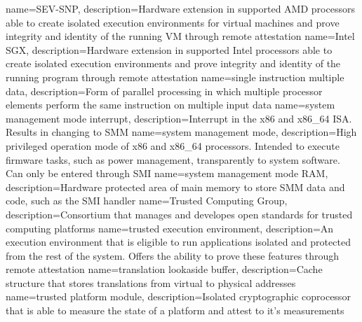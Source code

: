 %
{
    name=SEV-SNP,
    description={Hardware extension in supported AMD processors able to create isolated execution environments for
            virtual machines and prove integrity and identity of the running VM through remote attestation}
}
{
    name=Intel SGX,
    description={Hardware extension in supported Intel processors able to create isolated execution environments and
            prove integrity and identity of the running program through remote attestation}
}
{
    name={single instruction multiple data},
    description={Form of parallel processing in which multiple processor elements perform the same instruction on
            multiple input data}
}
{
    name=system management mode interrupt,
    description={Interrupt in the x86 and x86\_64 ISA. Results in changing to SMM}
}
{
    name=system management mode,
    description={High privileged operation mode of x86 and x86\_64 processors. Intended to execute firmware tasks, such
            as power management, transparently to system software. Can only be entered through SMI}
}
{
    name=system management mode RAM,
    description={Hardware protected area of main memory to store SMM data and code, such as the
            SMI handler}
}
%
{
    name=Trusted Computing Group,
    description={Consortium that manages and developes open standards for trusted computing platforms}
}
{
    name=trusted execution environment,
    description={An execution environment that is eligible to run applications isolated and protected from the rest of
            the system. Offers the ability to prove these features through remote attestation}
}
{
    name=translation lookaside buffer,
    description={Cache structure that stores translations from virtual to physical addresses}
}
{
    name=trusted platform module,
    description={Isolated cryptographic coprocessor that is able to measure the state of a platform and attest to it's measurements}
}
